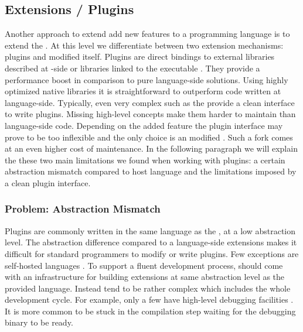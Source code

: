 \subsection{\VM Extensions / Plugins}
Another approach to extend add new features to a programming language is to extend the \VM.
At this level we differentiate between two extension mechanisms: \VM plugins and modified \VMs itself.
Plugins are direct bindings to external libraries described at \VM-side or libraries linked to the \VM executable \cite[Ch.\ 5]{Blac09a}. 
They provide a performance boost in comparison to pure language-side solutions.
Using highly optimized native libraries it is straightforward to outperform code written at language-side.
Typically, even very complex \VMs such as the \Self \VM \cite{Unga07a} provide a clean interface to write plugins.
Missing high-level concepts make them harder to maintain than language-side code.
Depending on the added feature the plugin interface may prove to be too inflexible and the only choice is an modified \VM.
Such a fork comes at an even higher cost of maintenance.
In the following paragraph we will explain the these two main limitations we found when working with plugins: a certain abstraction mismatch compared to host language and the limitations imposed by a clean plugin interface.


\subsubsection*{Problem: Abstraction Mismatch}
Plugins are commonly written in the same language as the \VM, at a low abstraction level.
The abstraction difference compared to a language-side extensions makes it difficult for standard programmers to modify or write \VM plugins.
Few exceptions are self-hosted languages \cite{Unga05a,Wimm13a,Rigo06a}.
To support a fluent development process, \VMs should come with an infrastructure for building extensions at same abstraction level as the provided language.
Instead \VMs tend to be rather complex which includes the whole development cycle.
For example, only a few \VMs have high-level debugging facilities \cite{Inga97a,Unga05a,Wimm13a}.
It is more common to be stuck in the compilation step waiting for the debugging binary to be ready.

